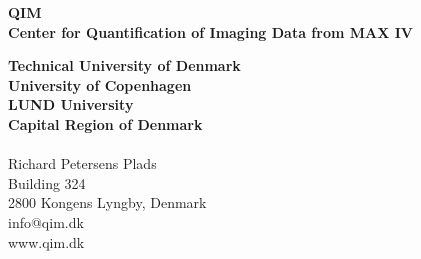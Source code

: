 \thispagestyle{empty} %
\vspace*{\fill}
\sffamily

\Large{
\noindent
\textbf{QIM}\\
\textbf{Center for Quantification of Imaging Data from MAX IV}\\
}

\small
\noindent
\textbf{Technical University of Denmark}\\
\textbf{University of Copenhagen}\\
\textbf{LUND University}\\
\textbf{Capital Region of Denmark}\\
\\
Richard Petersens Plads\\
Building 324\\
2800 Kongens Lyngby, Denmark\\
info@qim.dk\\
www.qim.dk\\
\normalsize
\normalfont
\vspace*{2.5cm}
